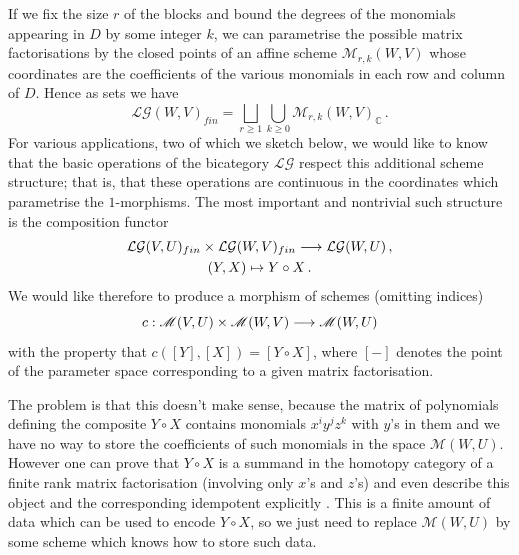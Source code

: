 \documentclass[english,letter paper,12pt,leqno]{article}
\theoremstyle{example}
\numberwithin{equation}{section}
\def\LG{\mathcal{LG}}
\def\nC{\mathds{C}}
\begin{document}
If we fix the size $r$ of the blocks and bound the degrees of the monomials appearing in $D$ by some integer $k$, we can parametrise the possible matrix factorisations by the closed points of an affine scheme $\mathscr{M}_{r,k}(W,V)$ whose coordinates are the coefficients of the various monomials in each row and column of $D$. Hence as sets we have
\begin{equation}\label{eq:param_frmf}
\LG(W,V)_{fin} = \bigsqcup_{r \ge 1} \bigcup_{k \ge 0} \mathscr{M}_{r,k}(W,V)_{\nC}\,.
\end{equation}
For various applications, two of which we sketch below, we would like to know that the basic operations of the bicategory $\LG$ respect this additional scheme structure; that is, that these operations are continuous in the coordinates which parametrise the $1$-morphisms. The most important and nontrivial such structure is the composition functor
\begin{gather*}
\LG(V,U)_{fin} \times \LG(W, V)_{fin} \lto \LG(W,U)\,,\\
(Y,X) \mapsto Y \circ X\,.
\end{gather*}
We would like therefore to produce a morphism of schemes (omitting indices)
\[
c: \mathscr{M}(V,U) \times \mathscr{M}(W,V) \longrightarrow \mathscr{M}(W,U)
\]
with the property that $c([Y], [X]) = [Y \circ X]$, where $[-]$ denotes the point of the parameter space corresponding to a given matrix factorisation.

The problem is that this doesn't make sense, because the matrix of polynomials defining the composite $Y \circ X$ contains monomials $x^i y^j z^k$ with $y$'s in them and we have no way to store the coefficients of such monomials in the space $\mathscr{M}(W,U)$. However one can prove that $Y \circ X$ is a summand in the homotopy category of a finite rank matrix factorisation (involving only $x$'s and $z$'s) and even describe this object and the corresponding idempotent explicitly \cite{dm1102.2957}. This is a finite amount of data which can be used to encode $Y \circ X$, so we just need to replace $\mathscr{M}(W,U)$ by some scheme which knows how to store such data.

\vspace{0.5cm}
\end{document}
